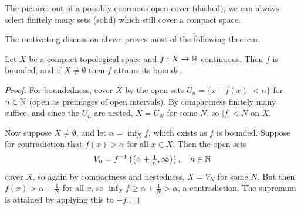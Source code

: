 \documentclass[a4paper]{scrartcl}
\begin{document}
\begin{center}
\end{center}

The picture: out of a possibly enormous open cover (dashed), we can always select finitely many sets (solid) which still cover a compact space.

The motivating discussion above proves most of the following theorem.

\begin{theorem}\label{thm:evt}
    Let $X$ be a compact topological space and $f: X \rightarrow \mathbb{R}$ continuous. Then $f$ is bounded, and if $X \neq \emptyset$ then $f$ attains its bounds.
\end{theorem}
\begin{proof}
    For boundedness, cover $X$ by the open sets $U_n = \{x \mid |f(x)| < n\}$ for $n \in \mathbb{N}$ (open as preimages of open intervals). By compactness finitely many suffice, and since the $U_n$ are nested, $X = U_N$ for some $N$, so $|f| < N$ on $X$.

    Now suppose $X \neq \emptyset$, and let $\alpha = \inf_X f$, which exists as $f$ is bounded. Suppose for contradiction that $f(x) > \alpha$ for all $x \in X$. Then the open sets
    $$
    V_n = f^{-1}\left(\left(\alpha + \tfrac{1}{n}, \infty\right)\right), \quad n \in \mathbb{N}
    $$
    cover $X$, so again by compactness and nestedness, $X = V_N$ for some $N$. But then $f(x) > \alpha + \frac{1}{N}$ for all $x$, so $\inf_X f \geq \alpha + \frac{1}{N} > \alpha$, a contradiction. The supremum is attained by applying this to $-f$.
\end{proof}
\end{document}
